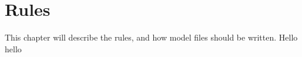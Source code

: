 \chapter{Rules}
This chapter will describe the rules, and how model files should be
written. Hello hello